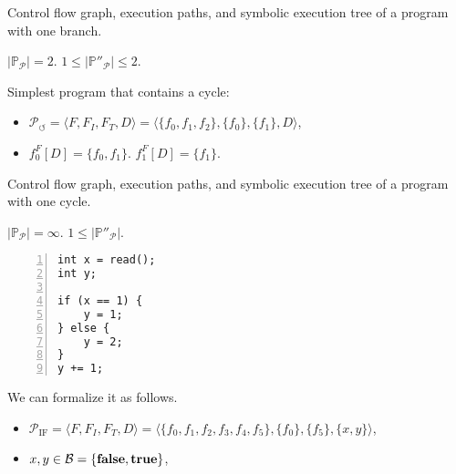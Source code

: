     {Control flow graph, execution paths,
        and symbolic execution tree of a program with one branch.}


$|\mathds{P}_\mathcal{P}| = 2$.
$1 \le |\mathds{P}''_\mathcal{P}| \le 2$.



Simplest program that contains a cycle:
\begin{itemize}
    \item $\mathcal{P}_{\circlearrowleft} = \langle F, F_I, F_T, D \rangle =
        \langle \{f_0, f_1, f_2\}, \{f_0\}, \{f_1\}, D \rangle$,
    \item $f_0^F[D] = \{f_0, f_1\}$. $f_1^F[D] = \{f_1\}$.
\end{itemize}

    {Control flow graph, execution paths,
        and symbolic execution tree of a program with one cycle.}


$|\mathds{P}_\mathcal{P}| = \infty$.
$1 \le |\mathds{P}''_\mathcal{P}|$.



\begin{lstlisting}[numbers=left,numberstyle=\scriptsize]
int x = read();
int y;

if (x == 1) {
    y = 1;
} else {
    y = 2;
}
y += 1;
\end{lstlisting}


We can formalize it as follows.
\begin{itemize}
    \item $\mathcal{P}_\text{IF} = \langle F, F_I, F_T, D \rangle =
    \langle \{f_0, f_1, f_2, f_3, f_4, f_5\},
        \{f_0\}, \{f_5\}, \{x, y\} \rangle$,
    \item $x, y \in \mathcal{B} = \{\textbf{false}, \textbf{true}\}$,
\end{itemize}


